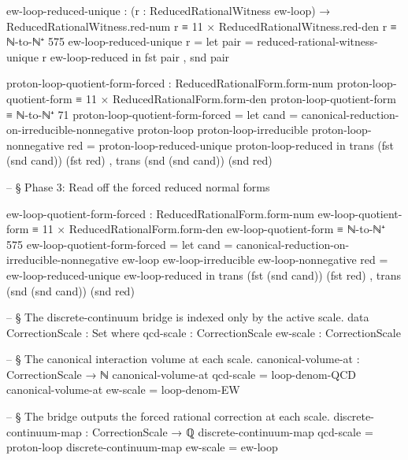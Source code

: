 \documentclass[11pt,a4paper]{book}
\begin{document}
\begin{code}
ew-loop-reduced-unique :
  (r : ReducedRationalWitness ew-loop) →
  ReducedRationalWitness.red-num r ≡ 11
  × ReducedRationalWitness.red-den r ≡ ℕ-to-ℕ⁺ 575
ew-loop-reduced-unique r =
  let pair = reduced-rational-witness-unique r ew-loop-reduced in
  fst pair , snd pair

proton-loop-quotient-form-forced :
  ReducedRationalForm.form-num proton-loop-quotient-form ≡ 11
  × ReducedRationalForm.form-den proton-loop-quotient-form ≡ ℕ-to-ℕ⁺ 71
proton-loop-quotient-form-forced =
  let
    cand =
      canonical-reduction-on-irreducible-nonnegative
        proton-loop proton-loop-irreducible proton-loop-nonnegative
    red = proton-loop-reduced-unique proton-loop-reduced
  in
  trans (fst (snd cand)) (fst red)
  , trans (snd (snd cand)) (snd red)

-- § Phase 3: Read off the forced reduced normal forms

ew-loop-quotient-form-forced :
  ReducedRationalForm.form-num ew-loop-quotient-form ≡ 11
  × ReducedRationalForm.form-den ew-loop-quotient-form ≡ ℕ-to-ℕ⁺ 575
ew-loop-quotient-form-forced =
  let
    cand =
      canonical-reduction-on-irreducible-nonnegative
        ew-loop ew-loop-irreducible ew-loop-nonnegative
    red = ew-loop-reduced-unique ew-loop-reduced
  in
  trans (fst (snd cand)) (fst red)
  , trans (snd (snd cand)) (snd red)

-- § The discrete-continuum bridge is indexed only by the active scale.
data CorrectionScale : Set where
  qcd-scale : CorrectionScale
  ew-scale  : CorrectionScale

-- § The canonical interaction volume at each scale.
canonical-volume-at : CorrectionScale → ℕ
canonical-volume-at qcd-scale = loop-denom-QCD
canonical-volume-at ew-scale  = loop-denom-EW

-- § The bridge outputs the forced rational correction at each scale.
discrete-continuum-map : CorrectionScale → ℚ
discrete-continuum-map qcd-scale = proton-loop
discrete-continuum-map ew-scale  = ew-loop


\end{code}
\end{document}
